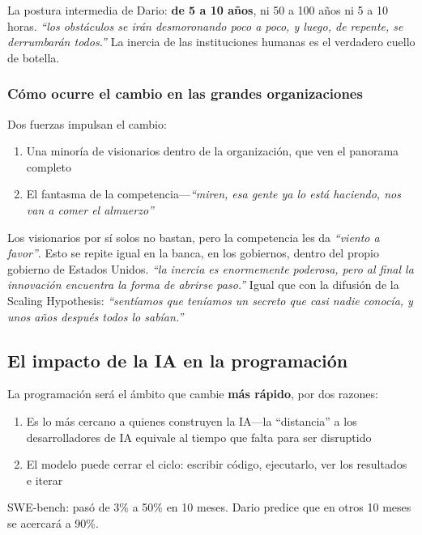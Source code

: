 \documentclass[a4paper]{article}
\begin{document}
La postura intermedia de Dario: \textbf{de 5 a 10 años}, ni 50 a 100 años ni 5 a 10 horas. \textit{``los obstáculos se irán desmoronando poco a poco, y luego, de repente, se derrumbarán todos.''} La inercia de las instituciones humanas es el verdadero cuello de botella.

\subsubsection{Cómo ocurre el cambio en las grandes organizaciones}

Dos fuerzas impulsan el cambio:
\begin{enumerate}
    \item Una minoría de visionarios dentro de la organización, que ven el panorama completo
    \item El fantasma de la competencia—\textit{``miren, esa gente ya lo está haciendo, nos van a comer el almuerzo''}
\end{enumerate}

Los visionarios por sí solos no bastan, pero la competencia les da \textit{``viento a favor''}. Esto se repite igual en la banca, en los gobiernos, dentro del propio gobierno de Estados Unidos. \textit{``la inercia es enormemente poderosa, pero al final la innovación encuentra la forma de abrirse paso.''} Igual que con la difusión de la Scaling Hypothesis: \textit{``sentíamos que teníamos un secreto que casi nadie conocía, y unos años después todos lo sabían.''}

\subsection{El impacto de la IA en la programación}

La programación será el ámbito que cambie \textbf{más rápido}, por dos razones:
\begin{enumerate}
    \item Es lo más cercano a quienes construyen la IA—la ``distancia'' a los desarrolladores de IA equivale al tiempo que falta para ser disruptido
    \item El modelo puede cerrar el ciclo: escribir código, ejecutarlo, ver los resultados e iterar
\end{enumerate}

SWE-bench: pasó de 3\% a 50\% en 10 meses. Dario predice que en otros 10 meses se acercará a 90\%.
\end{document}
